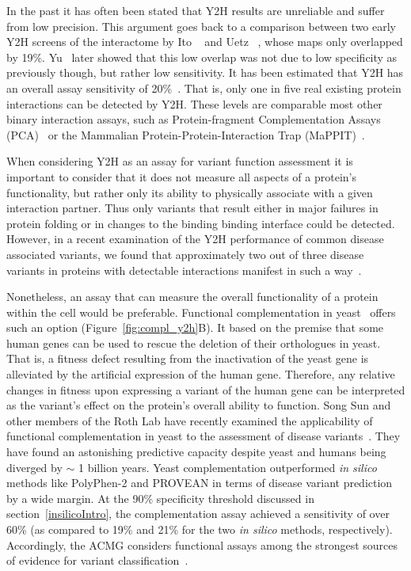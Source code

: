 In the past it has often been stated that Y2H results are unreliable and suffer from low precision. This argument goes back to a comparison between two early Y2H screens of the  interactome by Ito \etal~\cite{ito_comprehensive_2001} and Uetz \etal~\cite{uetz_comprehensive_2000}, whose maps only overlapped by 19\%. Yu \etal\ later showed that this low overlap was not due to low specificity as previously though, but rather low sensitivity. It has been estimated that Y2H has an overall assay sensitivity of 20\%~\cite{venkatesan_empirical_2009}. That is, only one in five real existing protein interactions can be detected by Y2H. These levels are comparable most other binary interaction assays, such as Protein-fragment Complementation Assays (PCA)~\cite{tarassov_vivo_2008} or the Mammalian Protein-Protein-Interaction Trap (MaPPIT)~\cite{eyckerman_design_2001}.

When considering Y2H as an assay for variant function assessment it is important to consider that it does not measure all aspects of a protein's functionality, but rather only its ability to physically associate with a given interaction partner. Thus only variants that result either in major failures in protein folding or in changes to the binding binding interface could be detected. However, in a recent examination of the Y2H performance of common disease associated variants, we found that approximately two out of three disease variants in proteins with detectable interactions manifest in such a way~\cite{sahni_widespread_2015}. 



Nonetheless, an assay that can measure the overall functionality of a protein within the cell would be preferable. Functional complementation in yeast~\cite{lee_complementation_1987,osborn_rescuing_2007} offers such an option (Figure~\ref{fig:compl_y2h}B). It based on the premise that some human genes can be used to rescue the deletion of their orthologues in yeast. That is, a fitness defect resulting from the inactivation of the yeast gene is alleviated by the artificial expression of the human gene. Therefore, any relative changes in fitness upon expressing a variant of the human gene can be interpreted as the variant's effect on the protein's overall ability to function. Song Sun and other members of the Roth Lab have recently examined the applicability of functional complementation in yeast to the assessment of disease variants~\cite{sun_extended_2016}. They have found an astonishing predictive capacity despite yeast and humans being diverged by $\sim$ 1 billion years. Yeast complementation outperformed \textit{in silico} methods like PolyPhen-2 and PROVEAN in terms of disease variant prediction by a wide margin. At the 90\% specificity threshold discussed in section~\ref{insilicoIntro}, the complementation assay achieved a sensitivity of over 60\% (as compared to 19\% and 21\% for the two \textit{in silico} methods, respectively). Accordingly, the ACMG considers functional assays among the strongest sources of evidence for variant classification~\cite{richards_standards_2015}.

